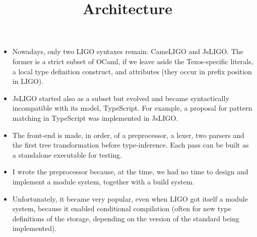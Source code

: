 \documentclass[wide]{slides}
\begin{document}
\begin{slide}
  \title{Architecture}

  \begin{itemize}

    \item Nowadays, only two LIGO syntaxes remain: \textsf{CameLIGO}
      and \textsf{JsLIGO}. The former is a strict subset of
      \textsf{OCaml}, if we leave aside the Tezos-specific literals, a
      local type definition construct, and attributes (they occur in
      prefix position in LIGO).

    \item \textsf{JsLIGO} started also as a subset but evolved and
      became syntactically incompatible with its model,
      \textsf{TypeScript}. For example, a proposal for pattern
      matching in \textsf{TypeScript} was implemented in
      \textsf{JsLIGO}.

    \item The front-end is made, in order, of a preprocessor, a lexer,
      two parsers and the first tree transformation before
      type\hyp{}inference. Each pass can be built as a standalone
      executable for testing.

    \item I wrote the preprocessor because, at the time, we had no
      time to design and implement a module system, together with a
      build system.

    \item Unfortunately, it became very popular, even when LIGO got
      itself a module system, because it enabled conditional
      compilation (often for new type definitions of the storage,
      depending on the version of the standard being implemented).

  \end{itemize}
\end{slide}
\end{document}

